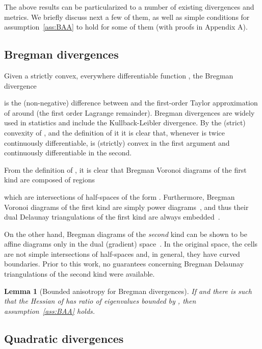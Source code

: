 \documentclass[11pt]{article}
\newtheorem{lemma}{Lemma}
\begin{document}
The above results can be particularized to a number of existing divergences and metrics. 
We briefly discuss next a few of them, as well as simple conditions for assumption~\ref{ass:BAA} to hold
	for some of them (with proofs in Appendix A). 







\subsection{Bregman divergences}\label{sec:DF}
Given a strictly convex, everywhere differentiable function , 
	the Bregman divergence

	is the (non-negative) difference between  and the first-order Taylor approximation of  around 
	(the first order Lagrange remainder). 
Bregman divergences are widely used in statistics and 
	include the Kullback-Leibler divergence. By the (strict) convexity of , and the definition of  it 
	it is clear that, whenever  is twice continuously differentiable, 
	 is (strictly) convex in the first argument and continuously differentiable in the second. 


From the definition of , it is clear that Bregman Voronoi diagrams of the first kind are composed of regions 
	
which are intersections of half-spaces of the form .
Furthermore, 
	Bregman Voronoi diagrams of the first kind are simply power diagrams~\cite{Bregman}, 
	and thus their dual Delaunay triangulations of the first kind are always embedded~\cite{powerdiag,DMG}. 


On the other hand, Bregman diagrams of the \emph{second} kind can be shown to be affine diagrams 
	only in the dual (gradient) space~\cite{Bregman}. 
In the original space, the cells  are not simple intersections of half-spaces and, in general, they have curved boundaries. 
Prior to this work, no guarantees concerning Bregman Delaunay triangulations of the second kind were available. 


\begin{lemma}[Bounded anisotropy for Bregman divergences]\label{lem:DFgamma}
If  and there is  such that the Hessian of  has ratio of eigenvalues bounded by ,
	then assumption~\ref{ass:BAA} holds. 
\end{lemma}



\subsection{Quadratic divergences}\label{sec:DQ}
\end{document}
